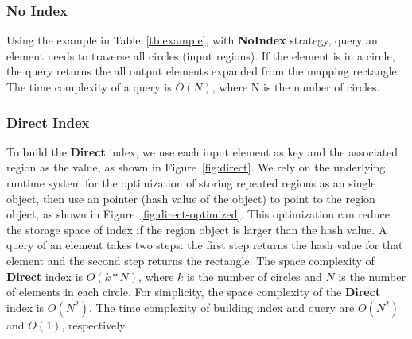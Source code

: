 \documentclass{sig-alternate}
\begin{document}
\subsubsection{No Index}
Using the example in Table~\ref{tb:example}, with {\bf NoIndex} strategy, query an element needs to traverse all circles (input regions).
If the element is in a circle, the query returns the all output elements expanded from the mapping rectangle.
The time complexity of a query is $O(N)$, where N is the number of circles. 

\subsubsection{Direct Index}
To build the {\bf Direct} index, we use each input element as key and the associated region as the value, as shown in Figure~\ref{fig:direct}.
We rely on the underlying runtime system for the optimization of storing repeated regions as an single object,
then use an pointer (hash value of the object) to point to the region object, as shown in Figure~\ref{fig:direct-optimized}.
This optimization can reduce the storage space of index if the region object is larger than the hash value. 
A query of an element takes two steps: the first step returns the hash value for that element and the second step returns the rectangle. 
The space complexity of {\bf Direct} index is $O(k*N)$, where $k$ is the number of circles and $N$ is the number of elements in each circle.
For simplicity, the space complexity of the {\bf Direct} index is $O(N^2)$.
The time complexity of building index and query are $O(N^2)$ and $O(1)$, respectively.
\end{document}
